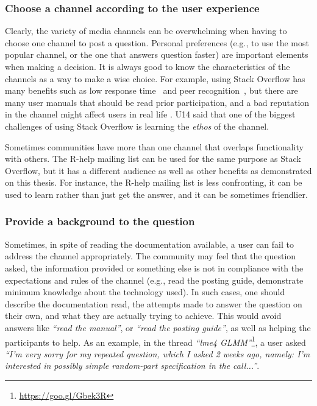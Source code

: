 \documentclass{sig-alternate-05-2015}
\begin{document}
	\subsubsection{Choose a channel according to the user experience}

		Clearly, the variety of media channels can be overwhelming when having to choose one channel to post a question.
		Personal preferences (e.g., to use the most popular channel, or the one that answers question faster) are important elements when making a decision.
		It is always good to know the characteristics of the channels as a way to make a wise choice.
		For example, using Stack Overflow has many benefits such as low response time~\cite{Mamykina2011} and peer recognition~\cite{Singer2013}, but there are many user manuals that should be read prior participation, and a bad reputation in the channel might affect users in real life \cite{Singer2013}.
		U14 said that one of the biggest challenges of using Stack Overflow is learning the \emph{ethos} of the channel.

		Sometimes communities have more than one channel that overlaps functionality with others.
		The R-help mailing list can be used for the same purpose as Stack Overflow, but it has a different audience as well as other benefits as demonstrated on this thesis.
		For instance, the R-help mailing list is less confronting, it can be used to learn rather than just get the answer, and it can be sometimes friendlier.

	\subsubsection{Provide a background to the question}

        Sometimes, in spite of reading the documentation available, a user can fail to address the channel appropriately. 
        The community may feel that the question asked, the information provided or something else is not in compliance with the expectations and rules of the channel (e.g., read the posting guide, demonstrate minimum knowledge about the technology used).
		In such cases, one should describe the documentation read, the attempts made to answer the question on their own, and what they are actually trying to achieve.
		This would avoid answers like \textit{``read the manual''}, or \textit{``read the posting guide''}, as well as helping the participants to help.
		As an example, in the thread \textit{``lme4 GLMM''}\footnote{\url{https://goo.gl/Gbek3R}}, a user asked \textit{``I'm very sorry for my repeated question, which I asked 2 weeks ago, namely: I'm interested in possibly simple random-part specification in the call...''}.
\end{document}
